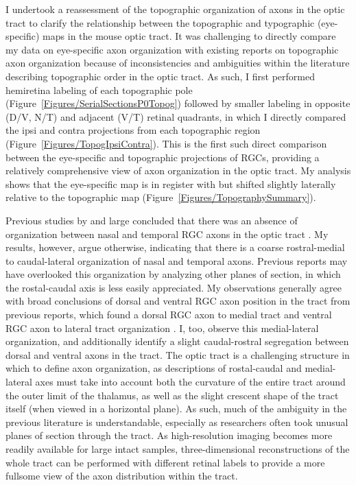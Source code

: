 I undertook a reassessment of the topographic organization of axons in the optic tract to clarify the relationship between the topographic and typographic (eye-specific) maps in the mouse optic tract.
It was challenging to directly compare my data on eye-specific axon organization with existing reports on topographic axon organization because of inconsistencies and ambiguities within the literature describing topographic order in the optic tract.
As such, I first performed hemiretina labeling of each topographic pole (Figure~\ref{Figures/SerialSectionsP0Topog}) followed by smaller labeling in opposite (D/V, N/T) and adjacent (V/T) retinal quadrants, in which I directly compared the ipsi and contra projections from each topographic region (Figure~\ref{Figures/TopogIpsiContra}).
This is the first such direct comparison between the eye-specific and topographic projections of RGCs, providing a relatively comprehensive view of axon organization in the optic tract.
My analysis shows that the eye-specific map is in register with but shifted slightly laterally relative to the topographic map (Figure~\ref{Figures/TopographySummary}).

Previous studies by and large concluded that there was an absence of organization between nasal and temporal RGC axons in the optic tract \cite{chan1994changes,plas2005pretarget,reese1993reestablishment}.
My results, however, argue otherwise, indicating that there is a coarse rostral-medial to caudal-lateral organization of nasal and temporal axons.
Previous reports may have overlooked this organization by analyzing other planes of section, in which the rostal-caudal axis is less easily appreciated.
My observations generally agree with broad conclusions of dorsal and ventral RGC axon position in the tract from previous reports, which found a dorsal RGC axon to medial tract and ventral RGC axon to lateral tract organization \cite{chan1999changes,chan1994changes,plas2005pretarget,reese1993reestablishment,reese1990fibre,reh1983organization,torrealba1982studies}.%
I, too, observe this medial-lateral organization, and additionally identify a slight caudal-rostral segregation between dorsal and ventral axons in the tract.
The optic tract is a challenging structure in which to define axon organization, as descriptions of rostal-caudal and medial-lateral axes must take into account both the curvature of the entire tract around the outer limit of the thalamus, as well as the slight crescent shape of the tract itself (when viewed in a horizontal plane).
As such, much of the ambiguity in the previous literature is understandable, especially as researchers often took unusual planes of section through the tract.
As high-resolution imaging becomes more readily available for large intact samples, three-dimensional reconstructions of the whole tract can be performed with different retinal labels to provide a more fullsome view of the axon distribution within the tract.

